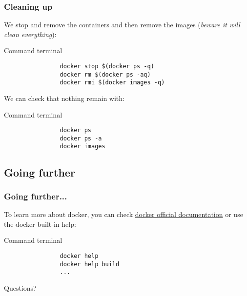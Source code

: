 	\begin{frame}[fragile]
		\frametitle{Cleaning up}
		
		We stop and remove the containers and then remove the images (\textit{beware it will clean everything}):
		\begin{block}{Command terminal}
			\begin{verbatim}
				docker stop $(docker ps -q)
				docker rm $(docker ps -aq)
				docker rmi $(docker images -q)
			\end{verbatim}
		\end{block}
				
		\bigskip
		We can check that nothing remain with:
		\begin{block}{Command terminal}
			\begin{verbatim}
				docker ps
				docker ps -a
				docker images
			\end{verbatim}
		\end{block}

	\end{frame}
	
\subsection{Going further}

	\begin{frame}[fragile]
		\frametitle{Going further...}
		
		To learn more about docker, you can check \href{https://docs.docker.com}{docker official documentation} or use the docker built-in help:

		\medskip		
		
		\begin{block}{Command terminal}
			\begin{verbatim}
				docker help
				docker help build
				...
			\end{verbatim}
		\end{block}
	\end{frame}
	
	\begin{frame}
		\begin{center}
			Questions?
		\end{center}
	\end{frame}